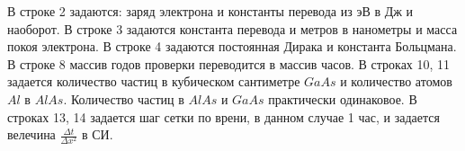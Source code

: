 В строке 2 задаются: заряд электрона и константы перевода из эВ в Дж и наоборот. В строке 3 задаются константа перевода и метров в нанометры и масса покоя электрона. В строке 4 задаются постоянная Дирака и константа Больцмана.
В строке 8 массив годов проверки переводится в массив часов. В строках 10, 11 задается количество частиц в кубическом сантиметре $GaAs$ и количество атомов $Al$ в $AlAs$. Количество частиц в $AlAs$ и $GaAs$ практически одинаковое. В строках 13, 14 задается шаг сетки по врени, в данном случае 1 час, и задается велечина $\frac{\Delta t}{\Delta x^{2}}$ в СИ.
